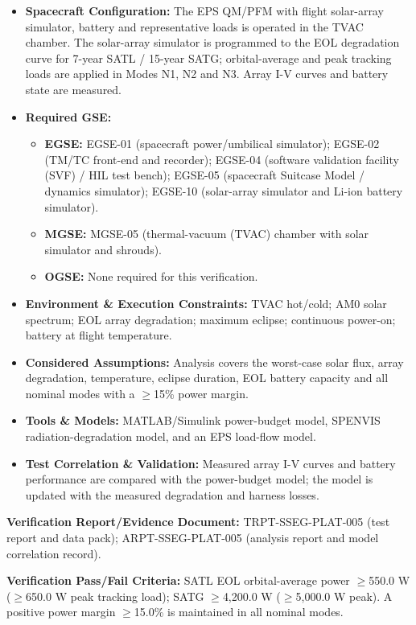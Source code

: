 \begin{itemize}
\item \textbf{Spacecraft Configuration:} The EPS QM/PFM with flight solar-array simulator, battery and representative loads is operated in the TVAC chamber. The solar-array simulator is programmed to the EOL degradation curve for 7-year SATL / 15-year SATG; orbital-average and peak tracking loads are applied in Modes N1, N2 and N3. Array I-V curves and battery state are measured.
\item \textbf{Required GSE:}
\begin{itemize}
\item \textbf{EGSE:} EGSE-01 (spacecraft power/umbilical simulator); EGSE-02 (TM/TC front-end and recorder); EGSE-04 (software validation facility (SVF) / HIL test bench); EGSE-05 (spacecraft Suitcase Model / dynamics simulator); EGSE-10 (solar-array simulator and Li-ion battery simulator).
\item \textbf{MGSE:} MGSE-05 (thermal-vacuum (TVAC) chamber with solar simulator and shrouds).
\item \textbf{OGSE:} None required for this verification.
\end{itemize}
\item \textbf{Environment \& Execution Constraints:} TVAC hot/cold; AM0 solar spectrum; EOL array degradation; maximum eclipse; continuous power-on; battery at flight temperature.
\item \textbf{Considered Assumptions:} Analysis covers the worst-case solar flux, array degradation, temperature, eclipse duration, EOL battery capacity and all nominal modes with a $\ge$15\% power margin.
\item \textbf{Tools \& Models:} MATLAB/Simulink power-budget model, SPENVIS radiation-degradation model, and an EPS load-flow model.
\item \textbf{Test Correlation \& Validation:} Measured array I-V curves and battery performance are compared with the power-budget model; the model is updated with the measured degradation and harness losses.
\end{itemize}
\par\textbf{Verification Report/Evidence Document:} TRPT-SSEG-PLAT-005 (test report and data pack); ARPT-SSEG-PLAT-005 (analysis report and model correlation record).
\par\textbf{Verification Pass/Fail Criteria:} SATL EOL orbital-average power $\ge$550.0 W ($\ge$650.0 W peak tracking load); SATG $\ge$4,200.0 W ($\ge$5,000.0 W peak). A positive power margin $\ge$15.0\% is maintained in all nominal modes.
\par\medskip
